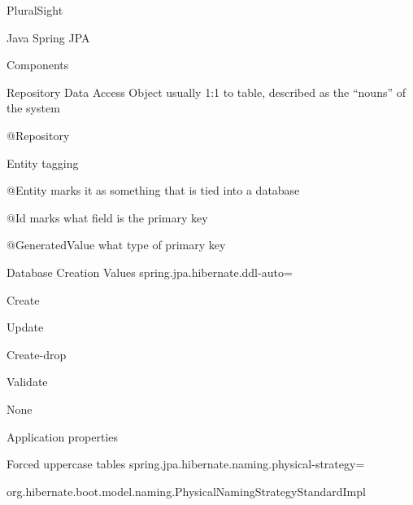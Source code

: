 \documentclass[presentation]{beamer}
\begin{document}
\begin{frame}[label={sec:org34d6546}]{PluralSight}
\begin{block}{Java Spring JPA}
\begin{block}{Components}
\begin{block}{Repository}
Data Access Object usually 1:1 to table, described as the ``nouns'' of the system
\begin{block}{@Repository}
\end{block}
\end{block}
\end{block}
\begin{block}{Entity tagging}
\begin{block}{@Entity}
marks it as something that is tied into a database
\end{block}
\begin{block}{@Id}
marks what field is the primary key
\end{block}
\begin{block}{@GeneratedValue}
what type of primary key
\end{block}
\end{block}
\begin{block}{Database Creation Values}
spring.jpa.hibernate.ddl-auto=
\begin{block}{Create}
\end{block}
\begin{block}{Update}
\end{block}
\begin{block}{Create-drop}
\end{block}
\begin{block}{Validate}
\end{block}
\begin{block}{None}
\end{block}
\end{block}
\begin{block}{Application properties}
\begin{block}{Forced uppercase tables}
spring.jpa.hibernate.naming.physical-strategy=

org.hibernate.boot.model.naming.PhysicalNamingStrategyStandardImpl
\end{block}
\end{block}


\end{block}
\end{frame}
\end{document}
